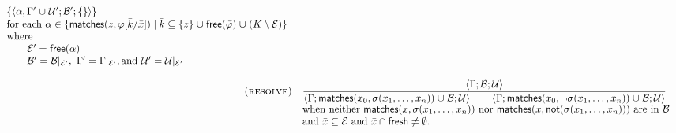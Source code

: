 \begin{figure*}
$$\begin{array}{rlrlrrr}
\begin{array}{l}
                                             { \{ \sequent{ \alpha, \Gamma' \union \Universals'; \Basic' ;  \{ \} } \}
                                             } \\
                                  \text{for each $\alpha \in \{ \matches{z}{\phi[\bar k/\bar x]} \mid \bar k \subset \{z\} \union \free{\bar \phi} \union (K \setminus \Elements) \}$} \\
                                  \text{where} \\
                                  \text{\qquad $\Elements'   = \free{\alpha}$} \\
                                  \text{\qquad $\Basic' = \Basic|_{\Elements'}$},
                                  \text{       $\Gamma' = \Gamma|_{\Elements'}$},
                                  \text{and    $\Universals' = \Universals|_{\Elements'}$}
                                  \end{array}
\\\\
\prule{resolve}                 & \multicolumn{3}{l}{
                                  \satrulebin{\sequent{ \Gamma; \Basic; \Universals}}
                                            {\sequent{ \Gamma; \matches{x_0}{\sigma(x_1,\ldots,x_n)}      \union \Basic; \Universals}}
                                            {\sequent{ \Gamma; \matches{x_0}{\lnot\sigma(x_1,\ldots,x_n)} \union \Basic; \Universals}} } \\
               & \multicolumn{3}{l}{\text{when neither $\matches{x}{{\sigma(x_1,\ldots,x_n)}}$ nor $\matches{x}{\fnot{\sigma(x_1,\ldots,x_n)}}$ are in $\Basic$}} \\
               & \multicolumn{3}{l}{\text{and  $\bar x \subset \Elements$ and $\bar x \intersection \mathsf{fresh} \neq \emptyset$.}} \\
\\
\end{array}$$
\end{figure*}
